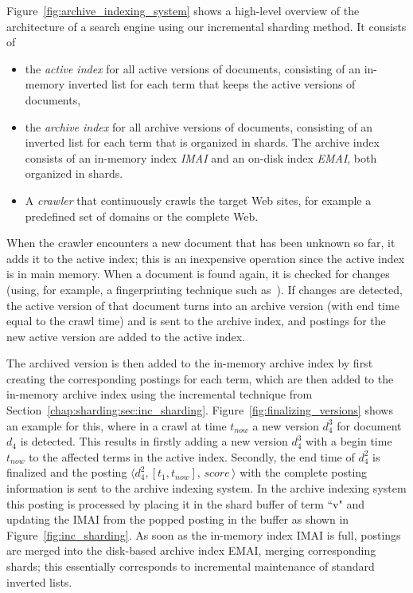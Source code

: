 Figure~\ref{fig:archive_indexing_system} shows a high-level overview
of the architecture of a search engine using our incremental sharding
method. It consists of
\begin{itemize}
\item the \emph{active index} for all active versions of documents,
  consisting of an in-memory inverted list for each term that keeps
  the active versions of documents,
\item the \emph{archive index} for all archive versions of documents,
  consisting of an inverted list for each term that is organized in
  shards. The archive index consists of an in-memory index \emph{IMAI}
  and an on-disk index \emph{EMAI}, both organized in shards.
\item A \emph{crawler} that continuously crawls the target Web sites,
  for example a predefined set of domains or the complete Web.
\end{itemize}

When the crawler encounters a new document that has been unknown so
far, it adds it to the active index; this is an inexpensive operation
since the active index is in main memory. When a document is found
again, it is checked for changes (using, for example, a fingerprinting
technique such
as~\cite{DBLP:journals/cn/BroderGMZ97,DBLP:conf/sigir/Henzinger06}). If
changes are detected, the active version of that document turns into
an archive version (with end time equal to the crawl time) and is
sent to the archive index, and postings for the new active
version are added to the active index.

The archived version is then added to the in-memory archive index by
first creating the corresponding postings for each term, which are
then added to the in-memory archive index using the incremental
technique from
Section~\ref{chap:sharding:sec:inc_sharding}. Figure~\ref{fig:finalizing_versions}
shows an example for this, where in a crawl at time $t_{now}$ a new
version $d_4^3$ for document $d_4$ is detected. This results in firstly
adding a new version $d_4^3$ with a begin time $t_{now}$ to the
affected terms in the active index. Secondly, the end time of $d_4^2$ is
finalized and the posting $\langle d_4^2, [t_1, t_{now}], \, score
\,\rangle$ with the complete posting information is sent to the
archive indexing system. In the archive indexing system this posting
is processed by placing it in the shard buffer of term ``v" and
updating the IMAI from the popped posting in the buffer as shown in
Figure~\ref{fig:inc_sharding}. As soon as the in-memory index IMAI is
full, postings are merged into the disk-based archive index EMAI,
merging corresponding shards; this essentially corresponds to
incremental maintenance of standard inverted lists.

